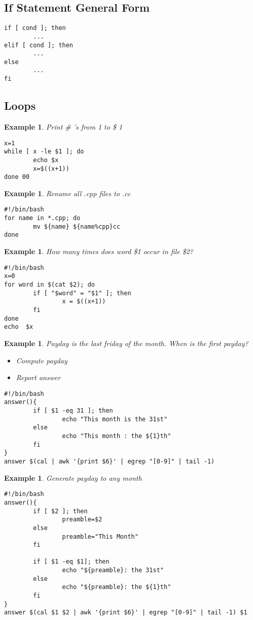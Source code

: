 \documentclass{article}
\newtheorem{ex}[theorem]{Example}
\begin{document}
\subsection{If Statement General Form}
\begin{lstlisting}
if [ cond ]; then
		... 
elif [ cond ]; then
		...
else
		...
fi
\end{lstlisting}

\subsection{Loops}
\begin{ex}
Print \# 's from 1 to \$ 1
\begin{lstlisting}
x=1
while [ x -le $1 ]; do
		echo $x
		x=$((x+1))
done 00
\end{lstlisting}
\end{ex}

\begin{ex}
Rename all .cpp files to .cc
\begin{lstlisting}
#!/bin/bash
for name in *.cpp; do
		mv ${name} ${name%cpp}cc
done
\end{lstlisting}
\end{ex}

\begin{ex}
How many times does word \$1 occur in file \$2?
\begin{lstlisting}
#!/bin/bash
x=0
for word in $(cat $2); do
		if [ "$word" = "$1" ]; then 
				x = $((x+1))
		fi 
done
echo  $x
\end{lstlisting}
\end{ex}

\begin{ex}
Payday is the last friday of the month. When is the first payday? 
\begin{itemize}
\item Compute payday 
\item Report answer
\end{itemize}
\begin{lstlisting}
#!/bin/bash
answer(){
		if [ $1 -eq 31 ]; then 
				echo "This month is the 31st" 
		else
				echo "This month : the ${1}th"
		fi
}
answer $(cal | awk '{print $6}' | egrep "[0-9]" | tail -1)
\end{lstlisting}
\end{ex}

\begin{ex}
Generate payday to any month
\begin{lstlisting}
#!/bin/bash
answer(){
		if [ $2 ]; then 
				preamble=$2
		else
				preamble="This Month"
		fi
		
		if [ $1 -eq $1]; then 
				echo "${preamble}: the 31st"
		else
				echo "${preamble}: the ${1}th"
		fi
}
answer $(cal $1 $2 | awk '{print $6}' | egrep "[0-9]" | tail -1) $1
\end{lstlisting}
\end{ex}
\end{document}

